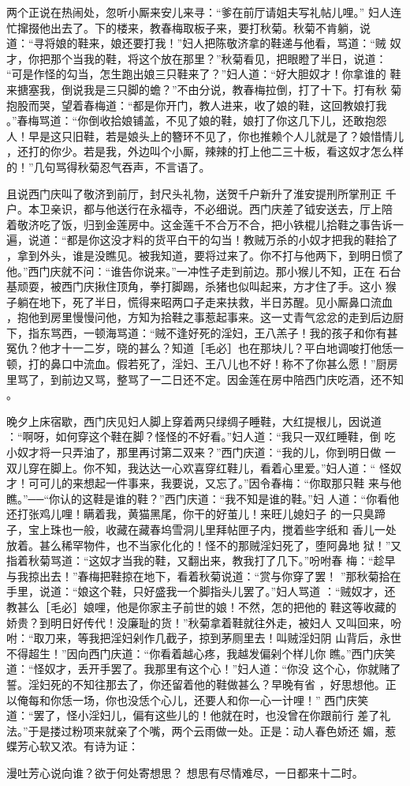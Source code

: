 两个正说在热闹处，忽听小厮来安儿来寻：“爹在前厅请姐夫写礼帖儿哩。”
妇人连忙撺掇他出去了。下的楼来，教春梅取板子来，要打秋菊。秋菊不肯躺，说
道：“寻将娘的鞋来，娘还要打我！”妇人把陈敬济拿的鞋递与他看，骂道：“贼
奴才，你把那个当我的鞋，将这个放在那里？”秋菊看见，把眼瞪了半日，说道：
“可是作怪的勾当，怎生跑出娘三只鞋来了？”妇人道：“好大胆奴才！你拿谁的
鞋来搪塞我，倒说我是三只脚的蟾？”不由分说，教春梅拉倒，打了十下。打有秋
菊抱股而哭，望着春梅道：“都是你开门，教人进来，收了娘的鞋，这回教娘打我
。”春梅骂道：“你倒收拾娘铺盖，不见了娘的鞋，娘打了你这几下儿，还敢抱怨
人！早是这只旧鞋，若是娘头上的簪环不见了，你也推赖个人儿就是了？娘惜情儿
，还打的你少。若是我，外边叫个小厮，辣辣的打上他二三十板，看这奴才怎么样
的！”几句骂得秋菊忍气吞声，不言语了。

且说西门庆叫了敬济到前厅，封尺头礼物，送贺千户新升了淮安提刑所掌刑正
千户。本卫亲识，都与他送行在永福寺，不必细说。西门庆差了钺安送去，厅上陪
着敬济吃了饭，归到金莲房中。这金莲千不合万不合，把小铁棍儿拾鞋之事告诉一
遍，说道：“都是你这没才料的货平白干的勾当！教贼万杀的小奴才把我的鞋拾了
，拿到外头，谁是没瞧见。被我知道，要将过来了。你不打与他两下，到明日惯了
他。”西门庆就不问：“谁告你说来。”一冲性子走到前边。那小猴儿不知，正在
石台基顽耍，被西门庆揪住顶角，拳打脚踢，杀猪也似叫起来，方才住了手。这小
猴子躺在地下，死了半日，慌得来昭两口子走来扶救，半日苏醒。见小厮鼻口流血
，抱他到房里慢慢问他，方知为拾鞋之事惹起事来。这一丈青气忿忿的走到后边厨
下，指东骂西，一顿海骂道：“贼不逢好死的淫妇，王八羔子！我的孩子和你有甚
冤仇？他才十一二岁，晓的甚么？知道［毛必］也在那块儿？平白地调唆打他恁一
顿，打的鼻口中流血。假若死了，淫妇、王八儿也不好！称不了你甚么愿！”厨房
里骂了，到前边又骂，整骂了一二日还不定。因金莲在房中陪西门庆吃酒，还不知
。

晚夕上床宿歇，西门庆见妇人脚上穿着两只绿绸子睡鞋，大红提根儿，因说道
：“啊呀，如何穿这个鞋在脚？怪怪的不好看。”妇人道：“我只一双红睡鞋，倒
吃小奴才将一只弄油了，那里再讨第二双来？”西门庆道：“我的儿，你到明日做
一双儿穿在脚上。你不知，我达达一心欢喜穿红鞋儿，看着心里爱。”妇人道：“
怪奴才！可可儿的来想起一件事来，我要说，又忘了。”因令春梅：“你取那只鞋
来与他瞧。”──“你认的这鞋是谁的鞋？”西门庆道：“我不知是谁的鞋。”妇
人道：“你看他还打张鸡儿哩！瞒着我，黄猫黑尾，你干的好茧儿！来旺儿媳妇子
的一只臭蹄子，宝上珠也一般，收藏在藏春坞雪洞儿里拜帖匣子内，搅着些字纸和
香儿一处放着。甚么稀罕物件，也不当家化化的！怪不的那贼淫妇死了，堕阿鼻地
狱！”又指着秋菊骂道：“这奴才当我的鞋，又翻出来，教我打了几下。”吩咐春
梅：“趁早与我掠出去！”春梅把鞋掠在地下，看着秋菊说道：“赏与你穿了罢！
”那秋菊拾在手里，说道：“娘这个鞋，只好盛我一个脚指头儿罢了。”妇人骂道
：“贼奴才，还教甚么［毛必］娘哩，他是你家主子前世的娘！不然，怎的把他的
鞋这等收藏的娇贵？到明日好传代！没廉耻的货！”秋菊拿着鞋就往外走，被妇人
又叫回来，吩咐：“取刀来，等我把淫妇剁作几截子，掠到茅厕里去！叫贼淫妇阴
山背后，永世不得超生！”因向西门庆道：“你看着越心疼，我越发偏剁个样儿你
瞧。”西门庆笑道：“怪奴才，丢开手罢了。我那里有这个心！”妇人道：“你没
这个心，你就赌了誓。淫妇死的不知往那去了，你还留着他的鞋做甚么？早晚有省
，好思想他。正以俺每和你恁一场，你也没恁个心儿，还要人和你一心一计哩！”
西门庆笑道：“罢了，怪小淫妇儿，偏有这些儿的！他就在时，也没曾在你跟前行
差了礼法。”于是搂过粉项来就亲了个嘴，两个云雨做一处。正是：动人春色娇还
媚，惹蝶芳心软又浓。有诗为证：

漫吐芳心说向谁？欲于何处寄想思？
想思有尽情难尽，一日都来十二时。